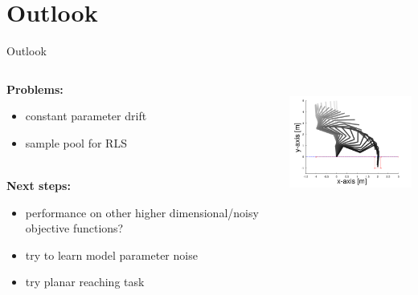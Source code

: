 \documentclass[navbarinfooter, 12pt]{sdqbeamer}
\begin{document}
\section{Outlook}
\begin{frame}{Outlook}

\begin{columns}[c]
  \begin{column}{9cm}
    \textbf{Problems:} \\
      \begin{itemize}
      \item constant parameter drift
      \item sample pool for RLS
      \end{itemize}
      $ $ \\
    \textbf{Next steps:} \\
    \begin{itemize}
      \item performance on other higher dimensional/noisy  objective functions?
      \item try to learn model parameter noise
      \item try planar reaching task
      \end{itemize}    
  \end{column}
  \begin{column}{5cm}
    \includegraphics[height=4cm]{figures/hole_reaching.png}
  \end{column}
\end{columns}  

\end{frame}


\end{document}
